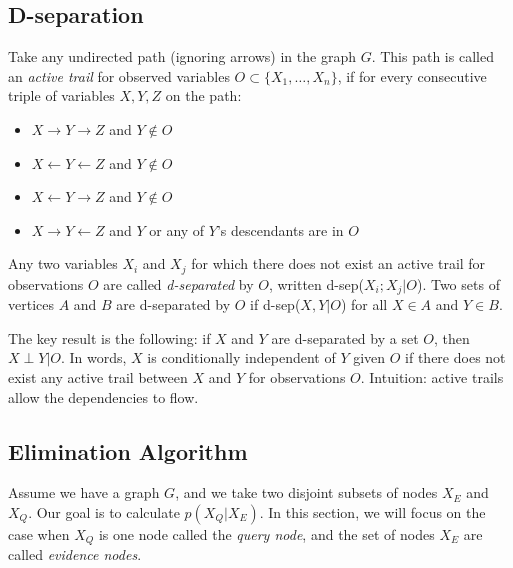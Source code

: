 \documentclass[12pt]{report}
\begin{document}
\subsection{D-separation}
Take any undirected path (ignoring arrows) in the graph $G$. This path
is called an \emph{active trail} for observed variables $O \subset
\{X_1,\ldots,X_n\}$, if for every consecutive triple of variables
$X,Y,Z$ on the path:
\begin{itemize}
\item $X \rightarrow Y \rightarrow Z$ and $Y\not\in O$
\item $X \leftarrow Y \leftarrow Z$ and $Y\not\in O$
\item $X \leftarrow Y \rightarrow Z$ and $Y\not\in O$
\item $X\rightarrow Y \leftarrow Z$ and $Y$ or any of $Y$'s
  descendants are in $O$
\end{itemize}

Any two variables $X_i$ and $X_j$ for which there does not exist an
active trail for observations $O$ are called \emph{d-separated} by
$O$, written d-sep($X_i;X_j|O$). Two sets of vertices $A$ and $B$ are
d-separated by $O$ if d-sep($X,Y|O$) for all $X\in A$ and $Y\in B$. 

The key result is the following: if $X$ and $Y$ are d-separated by a
set $O$, then $X \perp Y | O$. In words, $X$ is conditionally
independent of $Y$ given $O$ if there does not exist any active trail
between $X$ and $Y$ for observations $O$. Intuition: active trails allow the
dependencies to flow. 

\subsection{Elimination Algorithm}
Assume we have a graph $G$, and we take two disjoint subsets of
nodes $X_E$ and $X_Q$. Our goal is to calculate $p(X_Q|X_E)$. In this
section, we will focus on the case when $X_Q$ is one node called the
\emph{query node}, and the set of nodes $X_E$ are called
\emph{evidence nodes}.
\end{document}
